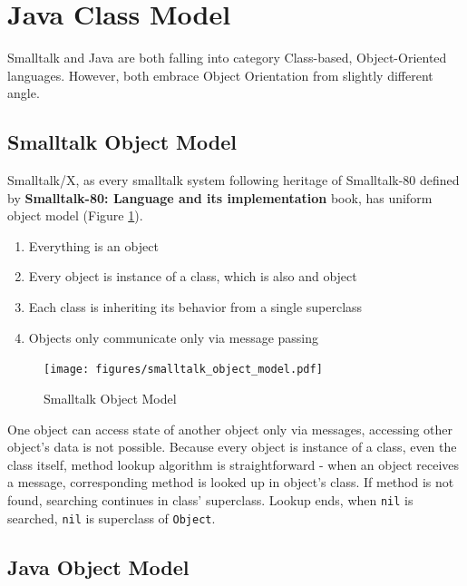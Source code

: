 \documentclass[11pt,twoside,a4paper]{book}
\begin{document}
\section{Java Class Model}

Smalltalk and Java are both falling into category Class-based, Object-Oriented languages.
However, both embrace Object Orientation from slightly different angle. 

\subsection{Smalltalk Object Model}

Smalltalk/X, as every smalltalk system following heritage of Smalltalk-80 defined by \textbf{Smalltalk-80: Language and its implementation} book\cite{bluebook}, has uniform object model (Figure \ref{fig:st_object_model}).

\begin{enumerate}
	\item Everything is an object
	\item Every object is instance of a class, which is also and object
	\item Each class is inheriting its behavior from a single superclass
	\item Objects only communicate only via message passing
\end{enumerate}


\begin{figure}[ht]
	\begin{center}
		\texttt{[image: figures/smalltalk\_object\_model.pdf]}
	\end{center}
	\caption{Smalltalk Object Model}
	\label{fig:st_object_model}
\end{figure}

One object can access state of another object only via messages, accessing other object's data is not possible. 
Because every object is instance of a class, even the class itself, method lookup algorithm is straightforward - when an object receives a message, corresponding method is looked up in object's class. 
If method is not found, searching continues in class' superclass. 
Lookup ends, when \texttt{nil} is searched, \texttt{nil} is superclass of \texttt{Object}.

\subsection{Java Object Model}
\end{document}
